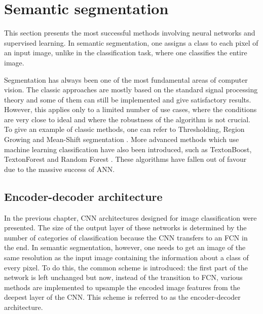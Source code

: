 \newpage
\section{Semantic segmentation}

This section presents the most successful methods involving neural networks and supervised learning. In semantic segmentation, one assigns a class to each pixel of an input image, unlike in the classification task, where one classifies the entire image. 

Segmentation has always been one of the most fundamental areas of computer vision. The classic approaches are mostly based on the standard signal processing theory and some of them can still be implemented and give satisfactory results. However, this applies only to a limited number of use cases, where the conditions are very close to ideal and where the robustness of the algorithm is not crucial. To give an example of classic methods, one can refer to Thresholding, Region Growing and Mean-Shift segmentation \cite{coufal}. More advanced methods which use machine learning classification have also been introduced, such as TextonBoost, TextonForest and Random Forest \cite{segnet} \cite{bayesian}. These algorithms have fallen out of favour due to the massive success of ANN.

\subsection{Encoder-decoder architecture}

In the previous chapter, CNN architectures designed for image classification were presented. The size of the output layer of these networks is determined by the number of categories of classification because the CNN transfers to an FCN in the end. In semantic segmentation, however, one needs to get an image of the same resolution as the input image containing the information about a class of every pixel. To do this, the common scheme is introduced: the first part of the network is left unchanged but now, instead of the transition to FCN, various methods are implemented to upsample the encoded image features from the deepest layer of the CNN. This scheme is referred to as the encoder-decoder architecture. \cite{stanford-L11}

